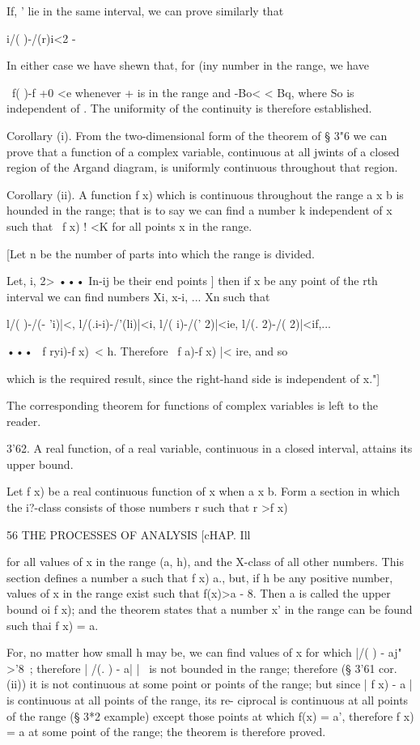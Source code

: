 If, ' lie in the same interval, we can prove similarly that

i/( )-/(r)i<2 -

In either case we have shewn that, for (iny number in the range, we
have

\ f( )-f +0 <e whenever + is in the range and -Bo< < Bq, where So is
independent of . The uniformity of the continuity is therefore
established.

Corollary (i). From the two-dimensional form of the theorem of § 3"6
we can prove that a function of a complex variable, continuous at all
jwints of a closed region of the Argand diagram, is uniformly
continuous throughout that region.

Corollary (ii). A function f x) which is continuous throughout the
range a x b is hounded in the range; that is to say we can find a
number k independent of x such that \ f x) ! <K for all points x in
the range.

[Let n be the number of parts into which the range is divided.

Let, i, 2> ••• In-ij be their end points ] then if x be any point of
the rth interval we can find numbers Xi, x-i, ... Xn such that

l/( )-/(- 'i)|<, l/(.i-i)-/'(li)|<i, l/( i)-/(' 2)|<ie, l/(. 2)-/(
2)|<if,...

••• \ f ryi)-f x)\ < h. Therefore \ f a)-f x) |< ire, and so

which is the required result, since the right-hand side is independent
of x."]

The corresponding theorem for functions of complex variables is left
to the reader.

3'62. A real function, of a real variable, continuous in a closed
interval, attains its upper bound.

Let f x) be a real continuous function of x when a x b. Form a section
in which the i?-class consists of those numbers r such that r >f x)



56 THE PROCESSES OF ANALYSIS [cHAP. Ill

for all values of x in the range (a, h), and the X-class of all other
numbers. This section defines a number a such that f x) a., but, if h
be any positive number, values of x in the range exist such that
f(x)>a - 8. Then a is called the upper bound oi f x); and the theorem
states that a number x' in the range can be found such thai f x) = a.

For, no matter how small h may be, we can find values of x for which
|/( ) - aj" >'8~; therefore | /(. ) - a| |~ is not bounded in the
range; therefore (§ 3'61 cor. (ii)) it is not continuous at some point
or points of the range; but since | f x) - a | is continuous at all
points of the range, its re- ciprocal is continuous at all points of
the range (§ 3*2 example) except those points at which f(x) = a',
therefore f x) = a at some point of the range; the theorem is
therefore proved.

